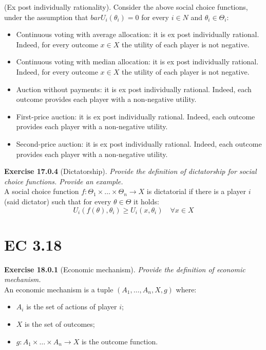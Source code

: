 (Ex post individually rationality). Consider the above social choice functions, under the assumption that $bar{U}_{i}\left(\theta_{i}\right)=0$ for every $i \in N$ and $\theta_i \in \Theta_i$:
\begin{itemize}
\item Continuous voting with average allocation: it is ex post individually rational. Indeed, for every outcome $x \in X$ the utility of each player is not negative.
\item Continuous voting with median allocation: it is ex post individually rational. Indeed, for every outcome $x \in X$ the utility of each player is not negative.
\item Auction without payments: it is ex post individually rational. Indeed, each outcome provides each player with a non-negative utility.
\item First-price auction: it is ex post individually rational. Indeed, each outcome provides each player with a non-negative utility.
\item Second-price auction: it is ex post individually rational. Indeed, each outcome provides each player with a non-negative utility.
\end{itemize}

\textbf{Exercise 17.0.4} (Dictatorship). \textit{Provide the definition of dictatorship for social choice functions. Provide an example.}\\

A social choice function $f: \Theta_{1} \times \ldots \times \Theta_{n} \rightarrow X$ is dictatorial if there is a player $i$ (said dictator) such that for every $\theta \in \Theta$ it holds:
$$
U_{i}\left(f(\theta), \theta_{i}\right) \geqslant U_{i}\left(x, \theta_{i}\right) \quad \forall x \in X
$$

\section{EC 3.18}

\textbf{Exercise 18.0.1} (Economic mechanism). \textit{Provide the definition of economic mechanism.}\\

An economic mechanism is a tuple $(A_1,\ldots,A_n,X,g)$ where:
\begin{itemize}
\item $A_i$ is the set of actions of player $i$;
\item $X$ is the set of outcomes;
\item $g: A_1 \times \ldots \times A_n\rightarrow X$ is the outcome function.
\end{itemize} 

